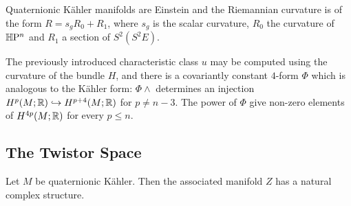 \documentclass{scrartcl}
\begin{document}
\begin{thm}
	Quaternionic K\"ahler manifolds are Einstein and the Riemannian curvature is of the form $R=s_g R_0+R_1$, where $s_g$ is the scalar curvature, $R_0$ the curvature of $\mathbb{H}\mathrm{P}^n$ and $R_1$ a section of $S^2(S^2E)$.
\end{thm}

The previously introduced characteristic class $u$ may be computed using the curvature of the bundle $H$, and there is a covariantly constant $4$-form $\Phi$ which is analogous to the K\"ahler form: $\Phi\wedge$ determines an injection $H^p(M;\mathbb{R})\hookrightarrow H^{p+4}(M;\mathbb{R})$ for $p\neq n-3$. The power of $\Phi$ give non-zero elements of $H^{4p}(M;\mathbb{R})$ for every $p\leq n$.

\subsection{The Twistor Space}

\begin{thm}
	Let $M$ be quaternionic K\"ahler. Then the associated manifold $Z$ has a natural complex structure.
\end{thm}
\end{document}
